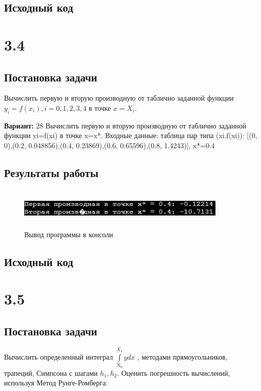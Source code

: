 \subsection{Исходный код}

\pagebreak

\section* {3.4}

\subsection{Постановка задачи}
Вычислить первую и вторую производную от таблично заданной функции $y_i=f(x_i), i=0,1,2,3,4$  в точке $x=X_i$.   

{\bfseries Вариант:} 28
Вычислить первую и вторую производную от таблично заданной функции yi=f(xi) в точке x=x*. Входные данные: таблица пар типа (xi,f(xi)): [(0, 0),(0.2, 0.048856),(0.4, 0.23869),(0.6, 0.65596),(0.8, 1.4243)], x*=0.4

\subsection{Результаты работы}
\begin{figure}[h!]
\centering
\includegraphics[width=10cm, height=2cm]{img/img4}
\caption{Вывод программы в консоли}
\end{figure}
\pagebreak

\subsection{Исходный код}


\pagebreak
\section* {3.5}

\subsection{Постановка задачи}
Вычислить определенный интеграл $\int\limits_{X_0}^{X_1} y dx$  , методами прямоугольников, трапеций, Симпсона с шагами $h_1,h_2$. Оценить погрешность вычислений, используя  Метод Рунге-Ромберга: 

